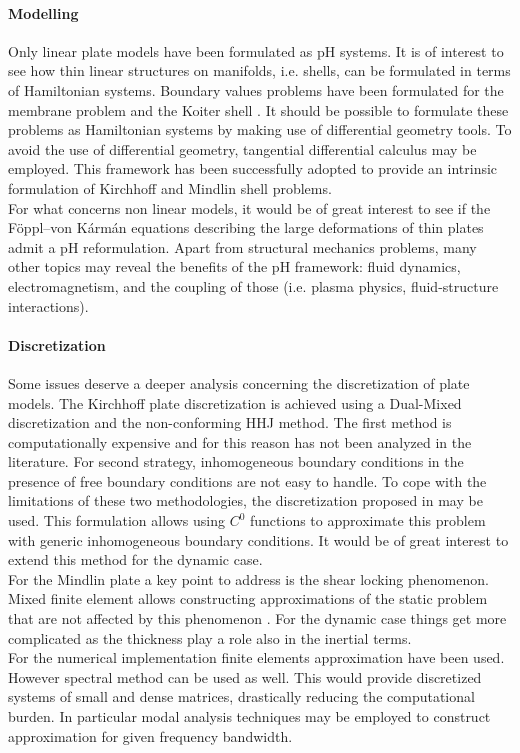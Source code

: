 \paragraph{Modelling}
Only linear plate models have been formulated as pH systems. It is of interest to see how thin linear structures on manifolds, i.e. shells, can be formulated in terms of Hamiltonian systems. Boundary values problems have been formulated for the membrane problem and the Koiter shell \cite{ciarlet2000shells}. It should be possible to formulate these problems as Hamiltonian systems by making use of differential geometry tools. To avoid the use of differential geometry, tangential differential calculus \cite{delfour2011shapes} may be employed. This framework has been successfully adopted to provide an intrinsic formulation of Kirchhoff \cite{schollhammer2019kirchhoff} and Mindlin \cite{schollhammer2019reissner} shell problems. \\
For what concerns non linear models, it would be of great interest to see if the F\"oppl–von K\'arm\'an equations describing the large deformations of thin plates \cite{bilbao2015conservative} admit a pH reformulation. Apart from structural mechanics problems, many other topics may reveal the benefits of the pH framework: fluid dynamics, electromagnetism, and the coupling of those (i.e. plasma physics, fluid-structure interactions).


\paragraph{Discretization}
Some issues deserve a deeper analysis concerning the discretization of plate models. The Kirchhoff plate discretization is achieved using a Dual-Mixed discretization and the non-conforming HHJ method. The first method is computationally expensive and for this reason has not been analyzed in the literature. For second strategy, inhomogeneous boundary conditions in the presence of free boundary conditions are not easy to handle. To cope with the limitations of these two methodologies, the discretization proposed in \cite{rafetseder2018siam} may be used.  This formulation allows using $C^0$ functions to approximate this problem with generic inhomogeneous boundary conditions. It would be of great interest to extend this method for the dynamic case. \\ For the Mindlin plate a key point to address is the shear locking phenomenon. Mixed finite element allows constructing approximations of the static problem that are not affected by this phenomenon \cite{veiga2013}. For the dynamic case things get more complicated as the thickness play a role also in the inertial terms. \\
For the numerical implementation finite elements approximation have been used. However spectral method can be used as well. This would provide discretized systems of small and dense matrices, drastically reducing the computational burden. In particular modal analysis techniques may be employed to construct approximation for given frequency bandwidth.

